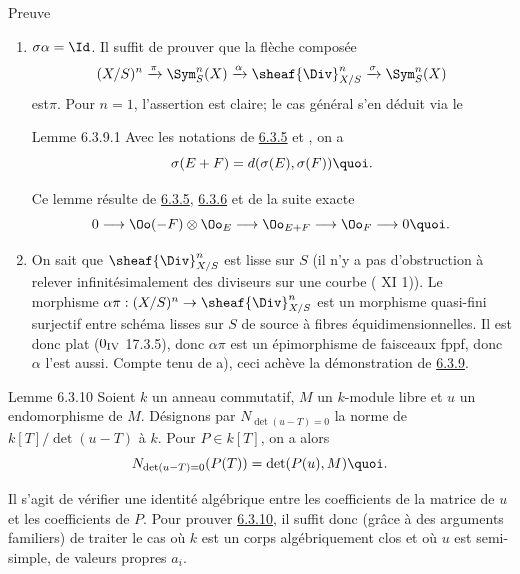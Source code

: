 \begin{enonce*}[remark]{Preuve}
\begin{enumerate}
\renewcommand{\theenumi}{\alph{enumi}}
\renewcommand{\labelenumi}{\theenumi)}
\item $\sigma\alpha=\Id$. Il suffit de prouver que la flèche composée
$$
(X/S)^{n}\xrightarrow{\pi}\Sym^{n}_{S}(X)\xrightarrow{\alpha}\sheaf{\Div}^{n}_{X/S}\xrightarrow{\sigma}\Sym^{n}_{S}(X)
$$
est\pageoriginale $\pi$. Pour $n=1$, l'assertion est claire; le cas
général s'en déduit via le

\begin{enonce*}{Lemme 6.3.9.1}
Avec les notations de \hyperref[XVII.prop6.3.5]{6.3.5} et , on a
\[
\sigma(E+F)=d(\sigma(E),\sigma(F)){\quoi}.
\]
\end{enonce*}

Ce lemme résulte de \hyperref[XVII.prop6.3.5]{6.3.5}, \hyperref[XVII.lem6.3.6]{6.3.6} et de la suite exacte
\[
0\longrightarrow \Oo(-F)\otimes \Oo_{E}\longrightarrow
\Oo_{E+F}\longrightarrow \Oo_{F}\longrightarrow 0{\quoi}.
\]

\item On sait que $\sheaf{\Div}^{n}_{X/S}$ est lisse sur $S$ (il n'y a pas
d'obstruction à relever infinitésimalement des diviseurs sur une
courbe (\cf {} XI 1)). Le morphisme
$\alpha\pi:(X/S)^{n}\rightarrow \sheaf{\Div}^{n}_{X/S}$ est un morphisme
quasi-fini surjectif entre schéma lisses sur $S$ de source à fibres
équidimensionnelles. Il est donc plat (\EGA ${\rm 0_{IV}}$ 17.3.5),
donc $\alpha\pi$ est un épimorphisme de faisceaux fppf, donc $\alpha$
l'est aussi. Compte tenu de a), ceci achève la démonstration de \hyperref[XVII.prop6.3.9]{6.3.9}.
\end{enumerate}
\end{enonce*}

\begin{enonce*}{Lemme 6.3.10}
Soient $k$ un anneau commutatif, $M$ un $k$-module libre et $u$ un
endomorphisme de $M$. Désignons par $N_{\det(u-T)=0}$ la norme de
$k[T]/\det(u-T)$ à $k$. Pour $P\in k[T]$, on a alors
\[
N_{\det(u-T)=0} (P(T))=\det(P(u),M){\quoi}.
\]
\end{enonce*}

Il s'agit de vérifier une identité algébrique entre les coefficients
de la matrice de $u$ et les coefficients de $P$. Pour prouver \hyperref[XVII.lem6.3.10]{6.3.10},
il suffit donc (grâce à des arguments familiers) de traiter le cas où
$k$ est un corps algébriquement clos et où $u$ est semi-simple, de
valeurs propres $a_{i}$.

